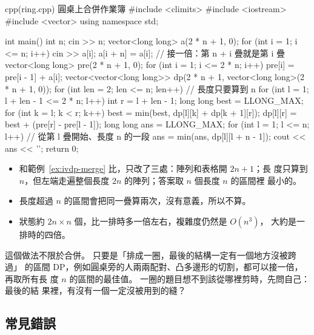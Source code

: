 \begin{example}[label=ex:ivdp-ring]{cpp}{(ring.cpp) 圓桌上合併作業簿}
#include <climits>
#include <iostream>
#include <vector>
using namespace std;

int main() {
    int n;
    cin >> n;
    vector<long long> a(2 * n + 1, 0);
    for (int i = 1; i <= n; i++) {
        cin >> a[i];
        a[i + n] = a[i];                       // 接一倍：第 n + i 疊就是第 i 疊
    }
    vector<long long> pre(2 * n + 1, 0);
    for (int i = 1; i <= 2 * n; i++) {
        pre[i] = pre[i - 1] + a[i];
    }
    vector<vector<long long>> dp(2 * n + 1, vector<long long>(2 * n + 1, 0));
    for (int len = 2; len <= n; len++) {       // 長度只要算到 n
        for (int l = 1; l + len - 1 <= 2 * n; l++) {
            int r = l + len - 1;
            long long best = LLONG_MAX;
            for (int k = l; k < r; k++) {
                best = min(best, dp[l][k] + dp[k + 1][r]);
            }
            dp[l][r] = best + (pre[r] - pre[l - 1]);
        }
    }
    long long ans = LLONG_MAX;
    for (int l = 1; l <= n; l++) {             // 從第 l 疊開始、長度 n 的一段
        ans = min(ans, dp[l][l + n - 1]);
    }
    cout << ans << '\n';
    return 0;
}
\end{example}


\begin{itemize}
\item 和範例~\ref{ex:ivdp-merge} 比，只改了三處：陣列和表格開 $2n + 1$；長
度只算到 $n$，但左端走遍整個長度 $2n$ 的陣列；答案取 $n$ 個長度 $n$ 的區間裡
最小的。
\item 長度超過 $n$ 的區間會把同一疊算兩次，沒有意義，所以不算。
\item 狀態約 $2n \times n$ 個，比一排時多一倍左右，複雜度仍然是 $O(n^3)$，
大約是一排時的四倍。
\end{itemize}

這個做法不限於合併。 只要是「排成一圈，最後的結構一定有一個地方沒被跨過」
的區間 DP，例如圓桌旁的人兩兩配對、凸多邊形的切割，都可以接一倍，再取所有長
度 $n$ 的區間的最佳值。 一圈的題目想不到該從哪裡剪時，先問自己：最後的結
果裡，有沒有一個一定沒被用到的縫？

\subsection{常見錯誤}


